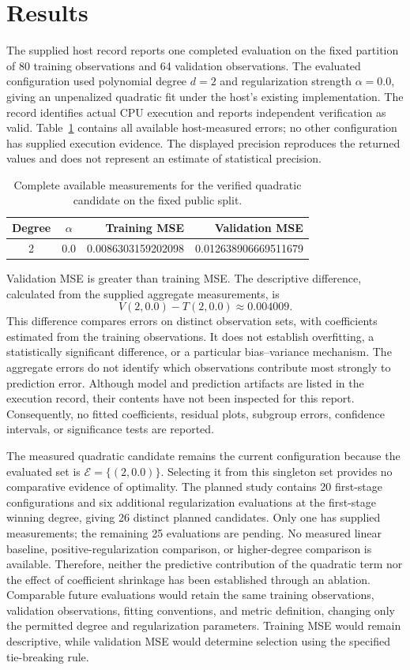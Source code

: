 \documentclass[11pt]{article}
\begin{document}
\section{Results}
The supplied host record reports one completed evaluation on the fixed partition of 80 training observations and 64 validation observations. The evaluated configuration used polynomial degree \(d=2\) and regularization strength \(\alpha=0.0\), giving an unpenalized quadratic fit under the host's existing implementation. The record identifies actual CPU execution and reports independent verification as valid. Table~\ref{tab:quadratic-results} contains all available host-measured errors; no other configuration has supplied execution evidence. The displayed precision reproduces the returned values and does not represent an estimate of statistical precision.
\begin{table}[ht]
\centering
\begin{tabular}{ccrr}
\hline
Degree & \(\alpha\) & Training MSE & Validation MSE \\
\hline
2 & 0.0 & 0.0086303159202098 & 0.012638906669511679 \\
\hline
\end{tabular}
\caption{Complete available measurements for the verified quadratic candidate on the fixed public split.}
\label{tab:quadratic-results}
\end{table}

Validation MSE is greater than training MSE. The descriptive difference, calculated from the supplied aggregate measurements, is
\[
V(2,0.0)-T(2,0.0)\approx 0.004009.
\]
This difference compares errors on distinct observation sets, with coefficients estimated from the training observations. It does not establish overfitting, a statistically significant difference, or a particular bias--variance mechanism. The aggregate errors do not identify which observations contribute most strongly to prediction error. Although model and prediction artifacts are listed in the execution record, their contents have not been inspected for this report. Consequently, no fitted coefficients, residual plots, subgroup errors, confidence intervals, or significance tests are reported.

The measured quadratic candidate remains the current configuration because the evaluated set is \(\mathcal{E}=\{(2,0.0)\}\). Selecting it from this singleton set provides no comparative evidence of optimality. The planned study contains 20 first-stage configurations and six additional regularization evaluations at the first-stage winning degree, giving 26 distinct planned candidates. Only one has supplied measurements; the remaining 25 evaluations are pending. No measured linear baseline, positive-regularization comparison, or higher-degree comparison is available. Therefore, neither the predictive contribution of the quadratic term nor the effect of coefficient shrinkage has been established through an ablation. Comparable future evaluations would retain the same training observations, validation observations, fitting conventions, and metric definition, changing only the permitted degree and regularization parameters. Training MSE would remain descriptive, while validation MSE would determine selection using the specified tie-breaking rule.
\end{document}
